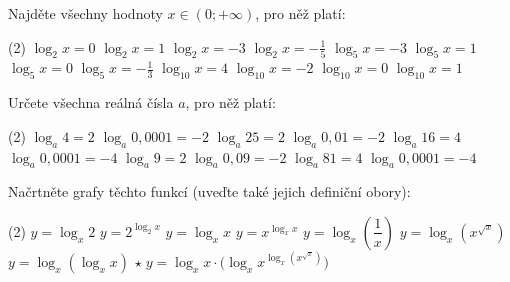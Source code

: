 \begin{exercise}
    Najděte všechny hodnoty $x \in (0; +\infty)$, pro něž platí:
    \begin{tasks}(2)
        \task $\log_2 x = 0$
        \task $\log_2 x = 1$
        \task $\log_2 x = -3$
        \task $\log_2 x = -\frac{1}{5}$
        \task $\log_5 x = -3$
        \task $\log_5 x = 1$
        \task $\log_5 x = 0$
        \task $\log_5 x = -\frac{1}{3}$
        \task $\log_{10} x = 4$
        \task $\log_{10} x = -2$
        \task $\log_{10} x = 0$
        \task $\log_{10} x = 1$
    \end{tasks}
\end{exercise}


\begin{exercise}
    Určete všechna reálná čísla $a$, pro něž platí:
    \begin{tasks}(2)
        \task $\log_a 4 = 2$
        \task $\log_a 0{,}0001 = -2$
        \task $\log_a 25 = 2$
        \task $\log_a 0{,}01 = -2$
        \task $\log_a 16 = 4$
        \task $\log_a 0{,}0001 = -4$
        \task $\log_a 9 = 2$
        \task $\log_a 0{,}09 = -2$
        \task $\log_a 81 = 4$
        \task $\log_a 0{,}0001 = -4$
    \end{tasks}
\end{exercise}


\begin{exercise}
    Načrtněte grafy těchto funkcí (uveďte také jejich definiční obory):
    \begin{tasks}(2)
        \task $y = \log_x 2$
        \task $y = 2^{\log_2 x}$
        \task $y = \log_x x$
        \task $y = x^{\log_x x}$
        \task $y = \log_x \left(\dfrac{1}{x}\right)$
        \task $y = \log_x \left(x^{\sqrt{x}}\right)$
        \task $y = \log_x \left(\log_x x\right)$
        \task $\star \; y = \log_x x \cdot \bigl(\log_x x^{\log_x (x^{\sqrt{x}})}\bigr)$
    \end{tasks}
\end{exercise}


